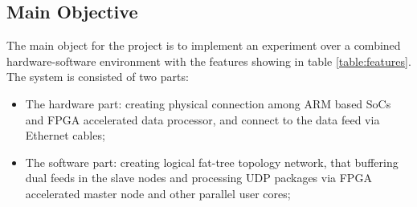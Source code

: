 \documentclass[11pt,openright,a4paper]{report}
\begin{document}
\subsection{Main Objective}
The main object for the project is to implement an experiment over a combined hardware-software environment with the features showing in table \ref{table:features}. The system is consisted of two parts:\\
\begin{itemize}
	\item The hardware part: creating physical connection among ARM based SoCs and FPGA accelerated data processor, and connect to the data feed via Ethernet cables;
	\item The software part: creating logical fat-tree topology network, that buffering dual feeds in the slave nodes and processing UDP packages via FPGA accelerated master node and other parallel user cores; 
\end{itemize}
\end{document}
